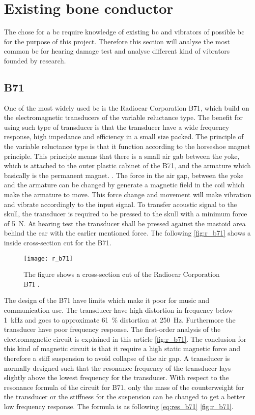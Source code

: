 \section{Existing bone conductor}
The chose for a \gls{bc} require knowledge of existing \gls{bc} and vibrators of possible \gls{bc} for the purpose of this project. Therefore this section will analyse the most common \gls{bc} for hearing damage test and analyse different kind of vibrators founded by research. 

\subsection{B71}
One of the most widely used \gls{bc} is the Radioear Corporation B71, which build on the electromagnetic transducers of the variable reluctance type. The benefit for using such type of transducer is that the transducer have a wide frequency response, high impedance and efficiency in a small size packed. The principle of the variable reluctance type is that it function according to the horseshoe magnet principle. This principle means that there is a small air gab between the yoke, which is attached to the outer plastic cabinet of the B71, and the armature which basically is the permanent magnet. \citep{the_balanced_2003}. The force in the air gap, between the yoke and the armature can be changed by generate a magnetic field in the coil which make the armature to move. This force change and movement will make vibration and vibrate accordingly to the input signal. To transfer acoustic signal to the skull, the transducer is required to be pressed to the skull with a minimum force of \SI{5}{\newton}. At hearing test the transducer shall be pressed against the mastoid area behind the ear with the earlier mentioned force. The following \autoref{fig:r_b71} shows a inside cross-section cut for the B71.

 \begin{figure}[H]
	\centering
		\texttt{[image: r\_b71]}
		\caption{The figure shows a cross-section cut of the Radioear Corporation B71  \citep{the_balanced_2003}.}
		\label{fig:r_b71}
\end{figure}

The design of the B71 have limits which make it poor for music and communication use. The transducer have high distortion in frequency below \SI{1}{\kilo\hertz} and goes to approximate \SI{61}{\percent} distortion at \SI{250}{\hertz}. Furthermore the transducer have poor frequency response. The first-order analysis of the electromagnetic circuit is explained in this article \autoref{fig:r_b71}. The conclusion for this kind of magnetic circuit is that it require a high static magnetic force and therefore a stiff suspension to avoid collapse of the air gap. A transducer is normally designed such that the resonance frequency of the transducer lays slightly above the lowest frequency for the transducer. With respect to the resonance formula of the circuit for B71, only the mass of the counterweight for the transducer or the stiffness for the suspension can be changed to get a better low frequency response. The formula is as following \autoref{eq:res_b71} \autoref{fig:r_b71}.

